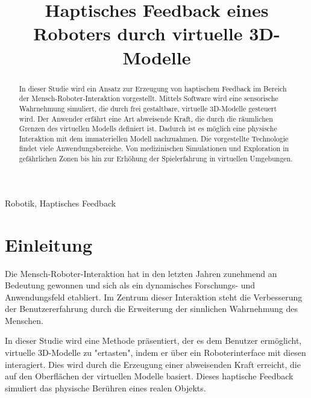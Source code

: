 \documentclass[conference]{IEEEtran}
\begin{document}
\title{Haptisches Feedback eines Roboters durch virtuelle 3D-Modelle}

\author{
    \and
}
\maketitle

\begin{abstract}
In dieser Studie wird ein Ansatz zur Erzeugung von haptischem Feedback im Bereich der Mensch-Roboter-Interaktion vorgestellt. Mittels Software wird eine sensorische Wahrnehmung simuliert, die durch frei gestaltbare, virtuelle 3D-Modelle gesteuert wird. Der Anwender erfährt eine Art abweisende Kraft, die durch die räumlichen Grenzen des virtuellen Modells definiert ist. Dadurch ist es möglich eine physische Interaktion mit dem immateriellen Modell nachzuahmen. Die vorgestellte Technologie findet viele Anwendungsbereiche. Von medizinischen Simulationen und Exploration in gefährlichen Zonen bis hin zur Erhöhung der Spielerfahrung in virtuellen Umgebungen.  

\end{abstract}

\begin{IEEEkeywords}
    Robotik, Haptisches Feedback 
\end{IEEEkeywords}

\section{Einleitung}
Die Mensch-Roboter-Interaktion hat in den letzten Jahren zunehmend an Bedeutung gewonnen und sich als ein dynamisches Forschungs- und Anwendungsfeld etabliert. Im Zentrum dieser Interaktion steht die Verbesserung der Benutzererfahrung durch die Erweiterung der sinnlichen Wahrnehmung des Menschen.

In dieser Studie wird eine Methode präsentiert, der es dem Benutzer ermöglicht, virtuelle 3D-Modelle zu "ertasten", indem er über ein Roboterinterface mit diesen interagiert. Dies wird durch die Erzeugung einer abweisenden Kraft erreicht, die auf den Oberflächen der virtuellen Modelle basiert. Dieses haptische Feedback simuliert das physische Berühren eines realen Objekts.
\end{document}
